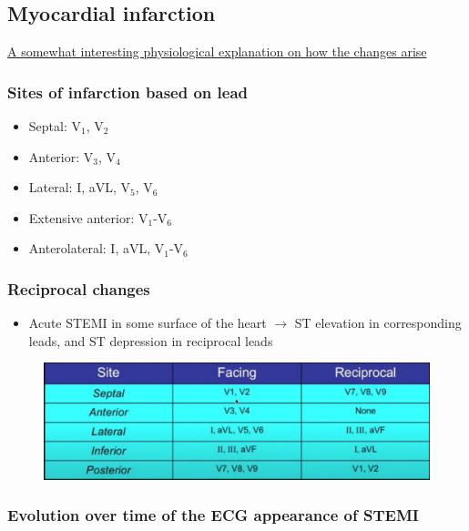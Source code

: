\documentclass[
  12pt,
]{memoir}
\providecommand{\tightlist}{%
  \setlength{\itemsep}{0pt}\setlength{\parskip}{0pt}}
\begin{document}
\hypertarget{myocardial-infarction}{%
\subsection{Myocardial infarction}\label{myocardial-infarction}}

\href{https://www.cvphysiology.com/CAD/CAD012}{A somewhat interesting
physiological explanation on how the changes arise}

\hypertarget{sites-of-infarction-based-on-lead}{%
\subsubsection{Sites of infarction based on
lead}\label{sites-of-infarction-based-on-lead}}

\begin{itemize}
\tightlist
\item
  Septal: V\(_1\), V\(_2\)
\item
  Anterior: V\(_3\), V\(_4\)
\item
  Lateral: I, aVL, V\(_5\), V\(_6\)
\item
  Extensive anterior: V\(_1\)-V\(_6\)
\item
  Anterolateral: I, aVL, V\(_1\)-V\(_6\)
\end{itemize}

\hypertarget{reciprocal-changes}{%
\subsubsection{Reciprocal changes}\label{reciprocal-changes}}

\begin{itemize}
\tightlist
\item
  Acute STEMI in some surface of the heart \(\rightarrow\) ST elevation
  in corresponding leads, and ST depression in reciprocal leads
\end{itemize}

\begin{figure}
\centering
\includegraphics[width=.6\textwidth]{../assets/med/reciprocal-leads.jpg}
\end{figure}

\pagebreak

\hypertarget{evolution-over-time-of-the-ecg-appearance-of-stemi}{%
\subsubsection{Evolution over time of the ECG appearance of
STEMI}\label{evolution-over-time-of-the-ecg-appearance-of-stemi}}
\end{document}
